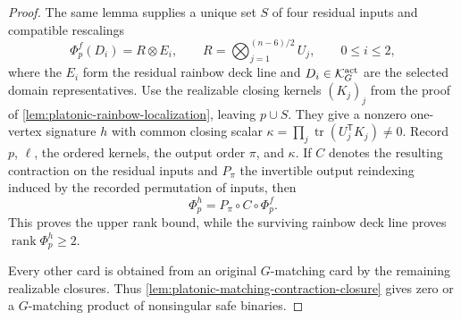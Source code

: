 \documentclass[11pt,letterpaper,onecolumn]{article}
\theoremstyle{plain}
\theoremstyle{definition}
\theoremstyle{remark}
\newcommand{\rank}{\operatorname{rank}}
\begin{document}
\begin{proof}
The same lemma supplies a unique
set \(S\) of four residual inputs and compatible rescalings
\[
 \Phi_p^f(D_i)=R\otimes E_i,
 \qquad
 R=\bigotimes_{j=1}^{(n-6)/2}U_j,
 \qquad 0\le i\le2,
\]
where the \(E_i\) form the residual rainbow deck line and
\(D_i\in\mathcal K_G^{\rm act}\) are the selected domain representatives.
Use the realizable closing kernels \((K_j)_j\) from the proof of
\cref{lem:platonic-rainbow-localization}, leaving \(p\cup S\).
They give a nonzero one-vertex signature \(h\) with common closing scalar
\(\kappa=\prod_j\operatorname{tr}(U_j^{\mathsf T}K_j)\ne0\).
Record \(p\), \(\ell\), the ordered kernels, the output order \(\pi\),
and \(\kappa\).
If \(C\) denotes the resulting contraction on the residual inputs and
\(P_\pi\) the invertible
output reindexing induced by the recorded permutation of inputs, then
\[
 \Phi_p^h=P_\pi\circ C\circ\Phi_p^f.
\]
This proves the upper rank bound, while the surviving rainbow deck line proves
\(\rank\Phi_p^h\ge2\).

Every other card is obtained from an original \(G\)-matching card by
the remaining realizable closures. Thus
\cref{lem:platonic-matching-contraction-closure} gives zero or a
\(G\)-matching product of nonsingular safe binaries.
\end{proof}
\end{document}
